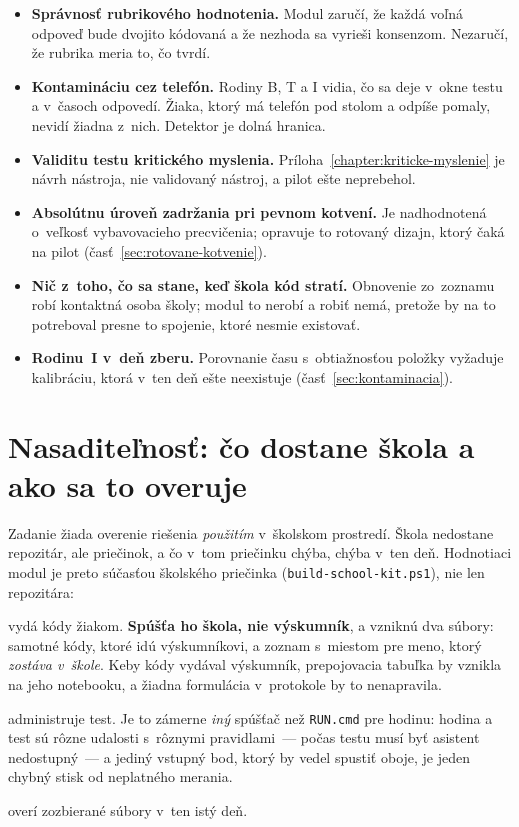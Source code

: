 \begin{itemize}[nosep]
    \item \textbf{Správnosť rubrikového hodnotenia.} Modul zaručí, že každá
          voľná odpoveď bude dvojito kódovaná a že nezhoda sa vyrieši konsenzom.
          Nezaručí, že rubrika meria to, čo tvrdí.
    \item \textbf{Kontamináciu cez telefón.} Rodiny B, T a I vidia, čo sa deje
          v~okne testu a v~časoch odpovedí. Žiaka, ktorý má telefón pod stolom a
          odpíše pomaly, nevidí žiadna z~nich. Detektor je dolná hranica.
    \item \textbf{Validitu testu kritického myslenia.} Príloha~\ref{chapter:kriticke-myslenie}
          je návrh nástroja, nie validovaný nástroj, a pilot ešte neprebehol.
    \item \textbf{Absolútnu úroveň zadržania pri pevnom kotvení.} Je nadhodnotená
          o~veľkosť vybavovacieho precvičenia; opravuje to rotovaný dizajn, ktorý
          čaká na pilot (časť~\ref{sec:rotovane-kotvenie}).
    \item \textbf{Nič z~toho, čo sa stane, keď škola kód stratí.} Obnovenie
          zo~zoznamu robí kontaktná osoba školy; modul to nerobí a robiť nemá,
          pretože by na to potreboval presne to spojenie, ktoré nesmie existovať.
    \item \textbf{Rodinu~I v~deň zberu.} Porovnanie času s~obtiažnosťou položky
          vyžaduje kalibráciu, ktorá v~ten deň ešte neexistuje
          (časť~\ref{sec:kontaminacia}).
\end{itemize}

\section{Nasaditeľnosť: čo dostane škola a ako sa to overuje}
\label{sec:nasaditelnost-modul}

Zadanie žiada overenie riešenia \emph{použitím} v~školskom prostredí. Škola
nedostane repozitár, ale priečinok, a čo v~tom priečinku chýba, chýba v~ten deň.
Hodnotiaci modul je preto súčasťou školského priečinka (\texttt{build-school-kit.ps1}),
nie len repozitára:

\begin{description}[leftmargin=0.6cm, nosep]
    \item[\texttt{KODY.cmd}] vydá kódy žiakom. \textbf{Spúšťa ho škola, nie
    výskumník}, a vzniknú dva súbory: samotné kódy, ktoré idú výskumníkovi, a
    zoznam s~miestom pre meno, ktorý \emph{zostáva v~škole}. Keby kódy vydával
    výskumník, prepojovacia tabuľka by vznikla na jeho notebooku, a žiadna
    formulácia v~protokole by to nenapravila.
    \item[\texttt{TEST.cmd}] administruje test. Je to zámerne \emph{iný} spúšťač
    než \texttt{RUN.cmd} pre hodinu: hodina a test sú rôzne udalosti s~rôznymi
    pravidlami~--- počas testu musí byť asistent nedostupný~--- a jediný vstupný
    bod, ktorý by vedel spustiť oboje, je jeden chybný stisk od neplatného
    merania.
    \item[\texttt{SKONTROLUJ.cmd}] overí zozbierané súbory v~ten istý deň.
\end{description}

